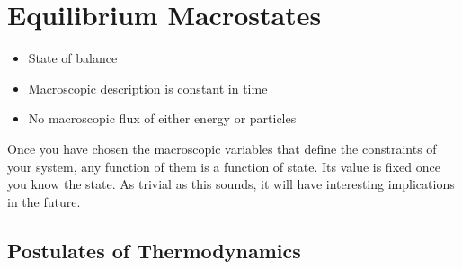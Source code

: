 \documentclass[a4paper,twoside,master.tex]{subfiles}
\begin{document}

\section{Equilibrium Macrostates}
\label{sec:equilibrium_macrostates}

\begin{itemize}
    \item State of balance
    \item Macroscopic description is constant in time
    \item No macroscopic flux of either energy or particles
\end{itemize}

\begin{definition}
    Once you have chosen the macroscopic variables that define the constraints of your system, any function of them is a function of state. Its value is fixed once you know the state. As trivial as this sounds, it will have interesting implications in the future.
\end{definition}

\subsection{Postulates of Thermodynamics}
\label{sub:postulates_of_thermodynamics}
\end{document}
